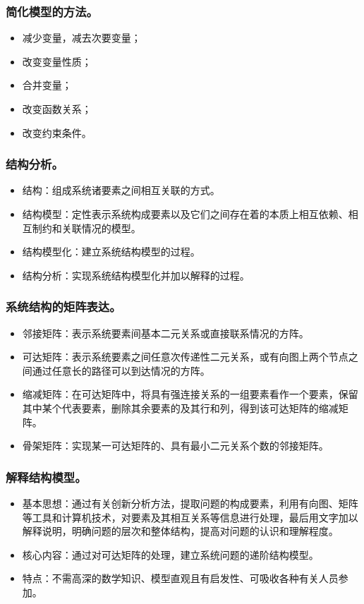 \documentclass{article}
\begin{document}
\subsubsection{简化模型的方法。}
\begin{itemize}
    \item 减少变量，减去次要变量；
    \item 改变变量性质；
    \item 合并变量；
    \item 改变函数关系；
    \item 改变约束条件。
\end{itemize}

\subsubsection{结构分析。}
\begin{itemize}
    \item 结构：组成系统诸要素之间相互关联的方式。
    \item 结构模型：定性表示系统构成要素以及它们之间存在着的本质上相互依赖、相互制约和关联情况的模型。
    \item 结构模型化：建立系统结构模型的过程。
    \item 结构分析：实现系统结构模型化并加以解释的过程。
\end{itemize}

\subsubsection{系统结构的矩阵表达。}
\begin{itemize}
    \item 邻接矩阵：表示系统要素间基本二元关系或直接联系情况的方阵。
    \item 可达矩阵：表示系统要素之间任意次传递性二元关系，或有向图上两个节点之间通过任意长的路径可以到达情况的方阵。
    \item 缩减矩阵：在可达矩阵中，将具有强连接关系的一组要素看作一个要素，保留其中某个代表要素，删除其余要素的及其行和列，得到该可达矩阵的缩减矩阵。
    \item 骨架矩阵：实现某一可达矩阵的、具有最小二元关系个数的邻接矩阵。
\end{itemize}

\subsubsection{解释结构模型。}
\begin{itemize}
    \item 基本思想：通过有关创新分析方法，提取问题的构成要素，利用有向图、矩阵等工具和计算机技术，对要素及其相互关系等信息进行处理，最后用文字加以解释说明，明确问题的层次和整体结构，提高对问题的认识和理解程度。
    \item 核心内容：通过对可达矩阵的处理，建立系统问题的递阶结构模型。
    \item 特点：不需高深的数学知识、模型直观且有启发性、可吸收各种有关人员参加。
\end{itemize}
\end{document}
